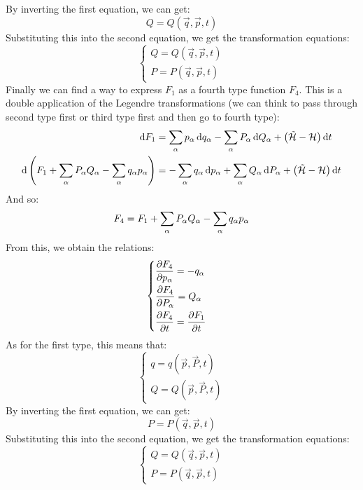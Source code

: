 By inverting the first equation, we can get:
\begin{equation}
    Q = Q(\vec{q},\vec{p},t)
\end{equation}
Substituting this into the second equation, we get the transformation equations:
\begin{equation}
    \begin{cases}
        Q = Q(\vec{q},\vec{p},t)\\[8pt]
        P = P(\vec{q},\vec{p},t)
    \end{cases}
\end{equation}
Finally we can find a way to express $F_1$ as a fourth type function $F_4$. This is a double application of the Legendre transformations (we can think to pass through second type first or third type first and then go to fourth type):
\begin{equation}
    \begin{split}
        \dd{F_1} &= \displaystyle\sum_{\alpha}p_{\alpha}\dd{q_{\alpha}} - \displaystyle\sum_{\alpha}P_{\alpha}\dd{Q_{\alpha}} + \left(\tilde{\mathcal{H}}- \mathcal{H}\right)\dd{t}\\
        \dd{\left(F_1 + \displaystyle\sum_{\alpha}P_{\alpha}Q_{\alpha} - \displaystyle\sum_{\alpha}q_{\alpha}p_{\alpha}\right)} &= -\displaystyle\sum_{\alpha}q_{\alpha}\dd{p_{\alpha}} + \displaystyle\sum_{\alpha}Q_{\alpha}\dd{P_{\alpha}} + \left(\tilde{\mathcal{H}}- \mathcal{H}\right)\dd{t}
    \end{split}
\end{equation}
And so:
\begin{equation}
    F_4 = F_1 + \displaystyle\sum_{\alpha}P_{\alpha}Q_{\alpha} - \displaystyle\sum_{\alpha}q_{\alpha}p_{\alpha}
\end{equation}
From this, we obtain the relations:
\begin{equation}
    \begin{cases}
        \pdv{F_4}{p_{\alpha}} = -q_{\alpha}\\[8pt]
        \pdv{F_4}{P_{\alpha}} = Q_{\alpha}\\[8pt]
        \pdv{F_4}{t} = \pdv{F_1}{t}
    \end{cases}
\end{equation}
As for the first type, this means that:
\begin{equation}
    \begin{cases}
        q = q(\vec{p},\vec{P},t)\\[8pt]
        Q = Q(\vec{p},\vec{P},t)
    \end{cases}
\end{equation}
By inverting the first equation, we can get:
\begin{equation}
    P = P(\vec{q},\vec{p},t)
\end{equation}
Substituting this into the second equation, we get the transformation equations:
\begin{equation}
    \begin{cases}
        Q = Q(\vec{q},\vec{p},t)\\[8pt]
        P = P(\vec{q},\vec{p},t)
    \end{cases}
\end{equation}
